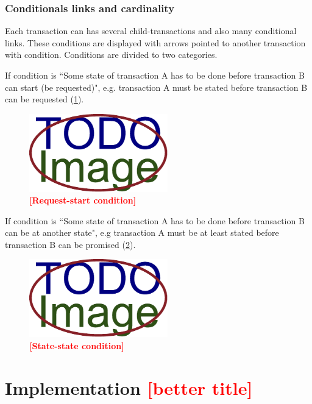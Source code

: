 \documentclass[thesis=B,english]{FITthesis}[2012/06/26]
\newcommand{\todo}[1]{\textcolor{red}{\textbf{[#1]}}}
\begin{document}
    \subsection{Conditionals links and cardinality}
    
    Each transaction can has several child-transactions and also many conditional links. These conditions are displayed with arrows pointed to another transaction with condition.
Conditions are divided to two categories.

If condition is ``Some state of transaction A has to be done before transaction B can start (be requested)", e.g. transaction A must be stated before transaction B can be requested (\cref{fig:request-start-condition}).

	 \begin{figure}
          \centering
          \includegraphics[width=6cm,keepaspectratio]{img/TODO-image}
          \caption{\todo{Request-start condition}}
          \label{fig:request-start-condition}
      \end{figure}  

If condition is ``Some state of transaction A has to be done before transaction B can be at another state", e.g transaction A must be at least stated before transaction B can be promised (\cref{fig:state-state-condition}).

	 \begin{figure}
          \centering
          \includegraphics[width=6cm,keepaspectratio]{img/TODO-image}
          \caption{\todo{State-state condition}}
           \label{fig:state-state-condition}
      \end{figure}  


\chapter{Implementation \todo{better title}}
\end{document}

